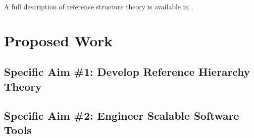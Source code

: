 \documentclass[11pt,proposal]{ucthesis}
\begin{document}
A full description of reference structure theory is available in \cite{paten2014mapping}.






\chapter{Proposed Work}

\section{Specific Aim \#1: Develop Reference Hierarchy Theory}




\section{Specific Aim \#2: Engineer Scalable Software Tools}


    
    
    

    
\end{document}
